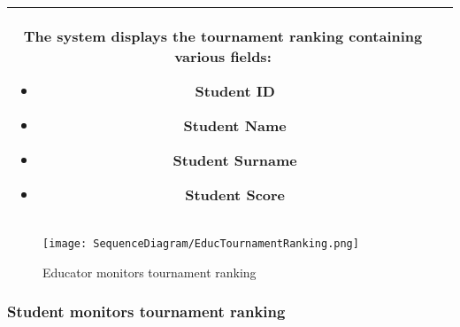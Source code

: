 \begin{longtable}{|c| p{10cm}|}
            The system displays the tournament ranking containing various fields:
            \begin{itemize}
                                \item Student ID
                                \item Student Name
                                \item Student Surname
                                \item Student Score 
                            \end{itemize}
\\
    \hline
\end{longtable}


    \begin{figure}[H]
  \texttt{[image: SequenceDiagram/EducTournamentRanking.png]} 
  \caption{Educator monitors tournament ranking}
  \label{fig:immagine}
\end{figure}

\subsubsection{Student monitors tournament ranking}

